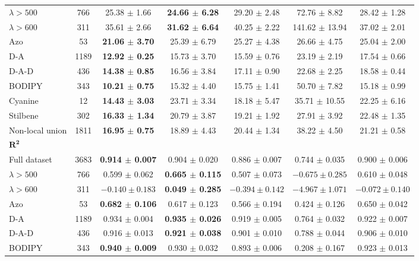 \documentclass[journal=jcisd8,manuscript=suppinfo]{achemso}
\begin{document}
\begin{table}[htbp]
\begin{tabular}{lcccccc}
$\lambda > 500$ & 766 & 25.38 $\pm$ 1.66 & \textbf{24.66 $\pm$ 6.28} & 29.20 $\pm$ 2.48 & 72.76 $\pm$ 8.82 & 28.42 $\pm$ 1.28 \\
$\lambda > 600$ & 311 & 35.61 $\pm$ 2.66 & \textbf{31.62 $\pm$ 6.64} & 40.25 $\pm$ 2.22 & 141.62 $\pm$ 13.94 & 37.02 $\pm$ 2.01 \\
Azo & 53 & \textbf{21.06 $\pm$ 3.70} & 25.39 $\pm$ 6.79 & 25.27 $\pm$ 4.38 & 26.66 $\pm$ 4.75 & 25.04 $\pm$ 2.00 \\
D-A & 1189 & \textbf{12.92 $\pm$ 0.25} & 15.73 $\pm$ 3.70 & 15.59 $\pm$ 0.76 & 23.19 $\pm$ 2.19 & 17.54 $\pm$ 0.66 \\
D-A-D & 436 & \textbf{14.38 $\pm$ 0.85} & 16.56 $\pm$ 3.84 & 17.11 $\pm$ 0.90 & 22.68 $\pm$ 2.25 & 18.58 $\pm$ 0.44 \\
BODIPY & 343 & \textbf{10.21 $\pm$ 0.75} & 15.32 $\pm$ 4.40 & 15.75 $\pm$ 1.41 & 50.70 $\pm$ 7.82 & 15.18 $\pm$ 0.99 \\
Cyanine & 12 & \textbf{14.43 $\pm$ 3.03} & 23.71 $\pm$ 3.34 & 18.18 $\pm$ 5.47 & 35.71 $\pm$ 10.55 & 22.25 $\pm$ 6.16 \\
Stilbene & 302 & \textbf{16.33 $\pm$ 1.34} & 20.79 $\pm$ 3.87 & 19.21 $\pm$ 1.92 & 27.91 $\pm$ 3.92 & 22.48 $\pm$ 1.35 \\
Non-local union & 1811 & \textbf{16.95 $\pm$ 0.75} & 18.89 $\pm$ 4.43 & 20.44 $\pm$ 1.34 & 38.22 $\pm$ 4.50 & 21.21 $\pm$ 0.58 \\
\midrule
\multicolumn{7}{l}{$\boldsymbol{R^2}$} \\
Full dataset & 3683 & \textbf{0.914 $\pm$ 0.007} & 0.904 $\pm$ 0.020 & 0.886 $\pm$ 0.007 & 0.744 $\pm$ 0.035 & 0.900 $\pm$ 0.006 \\
$\lambda > 500$ & 766 & 0.599 $\pm$ 0.062 & \textbf{0.665 $\pm$ 0.115} & 0.507 $\pm$ 0.073 & $-0.675 \pm 0.285$ & 0.610 $\pm$ 0.048 \\
$\lambda > 600$ & 311 & $-0.140 \pm 0.183$ & \textbf{0.049 $\pm$ 0.285} & $-0.394 \pm 0.142$ & $-4.967 \pm 1.071$ & $-0.072 \pm 0.140$ \\
Azo & 53 & \textbf{0.682 $\pm$ 0.106} & 0.617 $\pm$ 0.123 & 0.566 $\pm$ 0.194 & 0.424 $\pm$ 0.126 & 0.650 $\pm$ 0.042 \\
D-A & 1189 & 0.934 $\pm$ 0.004 & \textbf{0.935 $\pm$ 0.026} & 0.919 $\pm$ 0.005 & 0.764 $\pm$ 0.032 & 0.922 $\pm$ 0.007 \\
D-A-D & 436 & 0.916 $\pm$ 0.013 & \textbf{0.921 $\pm$ 0.038} & 0.901 $\pm$ 0.010 & 0.788 $\pm$ 0.044 & 0.906 $\pm$ 0.010 \\
BODIPY & 343 & \textbf{0.940 $\pm$ 0.009} & 0.930 $\pm$ 0.032 & 0.893 $\pm$ 0.006 & 0.208 $\pm$ 0.167 & 0.923 $\pm$ 0.013 \\

\end{tabular}
\end{table}
\end{document}
